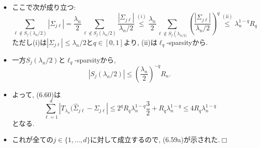 \documentclass[unicode,aspectratio=169,11pt]{beamer}
\def\qed{\hfill $\Box$}
\begin{document}
\begin{frame}{}{}
  \begin{itemize}
    \item ここで次が成り立つ:
          \[
            \sum_{\ell \notin S_{j}\left(\lambda_{n} / 2\right)}\left|\Sigma_{j \ell}\right|
            =\frac{\lambda_{n}}{2} \sum_{\ell \notin S_{j}\left(\lambda_{n} / 2\right)} \frac{\left|\Sigma_{j \ell}\right|}{\lambda_{n} / 2}
            \stackrel{\mathrm{(i)}}{\leq} \frac{\lambda_{n}}{2} \sum_{\ell \notin S_{j}\left(\lambda_{n / 2)}\right.}\left(\frac{\left|\Sigma_{j \ell}\right|}{\lambda_{n} / 2}\right)^{q}
            \stackrel{\mathrm{(ii)}}{\leq} \lambda_{n}^{1-q} R_{q}
          \]
          ただし(i)は$|\Sigma_{j\ell}|\le \lambda_n/2$と$q \in [0,1]$より, (ii)は$\ell_q$-sparsityから.
    \item 一方$S_j(\lambda_n/2)$と$\ell_q$-sparsityから,
          \[
            |S_j(\lambda_n / 2)| \le \left(\frac{\lambda_n}{2}\right)^{-q}R_n.
          \]
    \item よって, (6.60)は
          \[
            \sum_{\ell = 1}^d |T_{\lambda_n}(\widehat{\Sigma}_{j\ell} - \Sigma_{j\ell}|
            \le 2^qR_q\lambda_n^{1-q}\frac{3}{2} + R_q \lambda_n^{1-q}
            \le 4 R_q \lambda_n^{1-q}
          \]
          となる.
    \item これが全ての$j \in \{1,\dots,d\}$に対して成立するので, (6.59a)が示された.\qed
  \end{itemize}
\end{frame}
\end{document}
